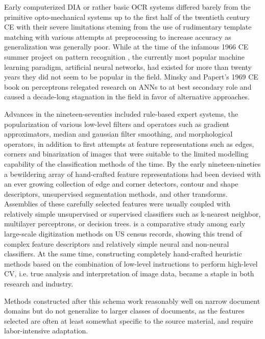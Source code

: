 Early computerized DIA or rather basic OCR systems differed barely from the
primitive opto-mechanical systems up to the first half of the twentieth century
CE with their severe limitations steming from the use of rudimentary template
matching with various attempts at preprocessing to increase accuracy as
generalization was generally poor. While at the time of the infamous 1966 CE
summer project on pattern recognition \cite{papert1966summer}, the currently
most popular machine learning paradigm, artificial neural networks, had existed
for more than twenty years they did not seem to be popular in the field. Minsky
and Papert's 1969 CE book on perceptrons \cite{minsky1969perceptron} relegated
research on ANNs to at best secondary role and caused a decade-long stagnation
in the field in favor of alternative approaches.

Advances in the nineteen-seventies included rule-based expert systems, the
popularization of various low-level filters and operators such as gradient
approximators, median and gaussian filter smoothing, and morphological
operators, in addition to first attempts at feature representations such as
edges, corners and binarization\cite{otsu1979threshold} of images that were
suitable to the limited modelling capability of the classification methods of
the time. By the early nineteen-nineties a bewildering array of hand-crafted
feature representations had been devised with an ever growing collection of
edge and corner detectors, contour and shape descriptors, unsupervised
segmentation methods, and other transforms. Assemblies of these carefully
selected features were usually coupled with relatively simple unsupervised or
supervised classifiers such as k-nearest neighbor, multilayer perceptrons, or
decision trees. \cite{wilkinson1992first} is a comparative study among early
large-scale digitization methods on US census records, showing this trend of
complex feature descriptors and relatively simple neural and non-neural
classifiers. At the same time, constructing completely hand-crafted heuristic
methods based on the combination of low-level instructions to perform
high-level CV, i.e. true analysis and interpretation of image data, became a
staple in both research and industry.

Methods constructed after this schema work reasonably well on narrow document
domains but do not generalize to larger classes of documents, as the features
selected are often at least somewhat specific to the source material, and
require labor-intensive adaptation. 

